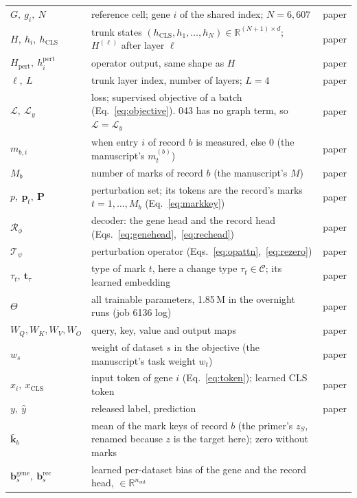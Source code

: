 \begin{longtable}{>{\raggedright\arraybackslash}p{34mm}>{\raggedright\arraybackslash}p{128mm}>{\raggedright\arraybackslash}p{10mm}}
$G,\ g_i,\ N$ & reference cell; gene $i$ of the shared index; $N = 6{,}607$ & paper \\
$H,\ h_i,\ h_{\mathrm{CLS}}$ & trunk states $(h_{\mathrm{CLS}}, h_1, \ldots, h_N) \in \mathbb{R}^{(N+1)\times d}$; $H^{(\ell)}$ after layer $\ell$ & paper \\
$H_{\mathrm{pert}},\ h^{\mathrm{pert}}_i$ & operator output, same shape as $H$ & paper \\
$\ell,\ L$ & trunk layer index, number of layers; $L = 4$ & paper \\
$\mathcal{L},\ \mathcal{L}_y$ & loss; supervised objective of a batch (Eq.~\ref{eq:objective}). 043 has no graph term, so $\mathcal{L} = \mathcal{L}_y$ & paper \\
$m_{b,i}$ & 1 when entry $i$ of record $b$ is measured, else 0 (the manuscript's $m_t^{(b)}$) & paper \\
$M_b$ & number of marks of record $b$ (the manuscript's $M$) & paper \\
$p,\ \mathbf{p}_t,\ \mathbf{P}$ & perturbation set; its tokens are the record's marks $t = 1, \ldots, M_b$ (Eq.~\ref{eq:markkey}) & paper \\
$\mathcal{R}_\phi$ & decoder: the gene head and the record head (Eqs.~\ref{eq:genehead},~\ref{eq:rechead}) & paper \\
$\mathcal{T}_\psi$ & perturbation operator (Eqs.~\ref{eq:opattn},~\ref{eq:rezero}) & paper \\
$\tau_t,\ \mathbf{t}_{\tau}$ & type of mark $t$, here a change type $\tau_t \in \mathcal{C}$; its learned embedding & paper \\
$\Theta$ & all trainable parameters, 1.85\,M in the overnight runs (job 6136 log) & paper \\
$W_Q, W_K, W_V, W_O$ & query, key, value and output maps & paper \\
$w_s$ & weight of dataset $s$ in the objective (the manuscript's task weight $w_t$) & paper \\
$x_i,\ x_{\mathrm{CLS}}$ & input token of gene $i$ (Eq.~\ref{eq:token}); learned CLS token & paper \\
$y,\ \hat y$ & released label, prediction & paper \\
\midrule
$\bar{\mathbf{k}}_b$ & mean of the mark keys of record $b$ (the primer's $z_S$, renamed because $z$ is the target here); zero without marks & 043 \\
$\mathbf{b}^{\mathrm{gene}}_s,\ \mathbf{b}^{\mathrm{rec}}_s$ & learned per-dataset bias of the gene and the record head, $\in \mathbb{R}^{n_{\mathrm{out}}}$ & 043 \\

\end{longtable}
